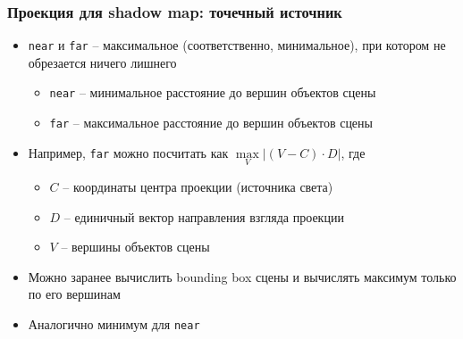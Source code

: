 \documentclass{beamer}
\begin{document}
\begin{frame}[fragile]
\frametitle{Проекция для shadow map: точечный источник}
\begin{itemize}
\item \verb|near| и \verb|far| -- максимальное (соответственно, минимальное), при котором не обрезается ничего лишнего
\pause
\begin{itemize}
\item \verb|near| -- минимальное расстояние до вершин объектов сцены
\item \verb|far| -- максимальное расстояние до вершин объектов сцены
\end{itemize}
\pause
\item Например, \verb|far| можно посчитать как \begin{math}\max\limits_V |(V - C) \cdot D|\end{math}, где
\begin{itemize}
\item \begin{math}C\end{math} -- координаты центра проекции (источника света)
\item \begin{math}D\end{math} -- единичный вектор направления взгляда проекции
\item \begin{math}V\end{math} -- вершины объектов сцены
\end{itemize}
\pause
\item Можно заранее вычислить bounding box сцены и вычислять максимум только по его вершинам
\pause
\item Аналогично минимум для \verb|near|
\end{itemize}
\end{frame}
\end{document}
